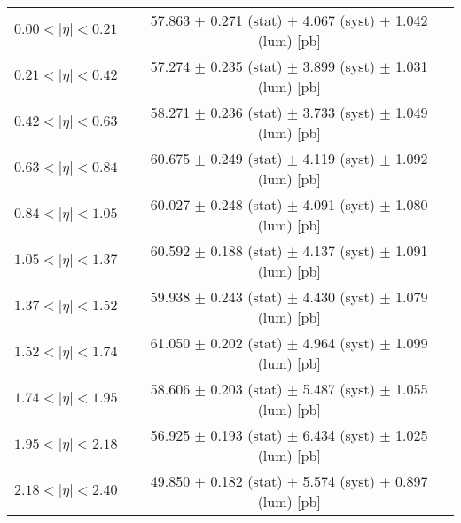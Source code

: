 \begin{tabular}{lc}
\hline
$0.00 < |\eta| <0.21$          & 57.863 $\pm$ 0.271 (stat) $\pm$ 4.067 (syst) $\pm$ 1.042 (lum) [pb]  \\
$0.21 < |\eta| <0.42$          & 57.274 $\pm$ 0.235 (stat) $\pm$ 3.899 (syst) $\pm$ 1.031 (lum) [pb]  \\
$0.42 < |\eta| <0.63$          & 58.271 $\pm$ 0.236 (stat) $\pm$ 3.733 (syst) $\pm$ 1.049 (lum) [pb]  \\
$0.63 < |\eta| <0.84$          & 60.675 $\pm$ 0.249 (stat) $\pm$ 4.119 (syst) $\pm$ 1.092 (lum) [pb]  \\
$0.84 < |\eta| <1.05$          & 60.027 $\pm$ 0.248 (stat) $\pm$ 4.091 (syst) $\pm$ 1.080 (lum) [pb]  \\
$1.05 < |\eta| <1.37$          & 60.592 $\pm$ 0.188 (stat) $\pm$ 4.137 (syst) $\pm$ 1.091 (lum) [pb]  \\
$1.37 < |\eta| <1.52$          & 59.938 $\pm$ 0.243 (stat) $\pm$ 4.430 (syst) $\pm$ 1.079 (lum) [pb]  \\
$1.52 < |\eta| <1.74$          & 61.050 $\pm$ 0.202 (stat) $\pm$ 4.964 (syst) $\pm$ 1.099 (lum) [pb]  \\
$1.74 < |\eta| <1.95$          & 58.606 $\pm$ 0.203 (stat) $\pm$ 5.487 (syst) $\pm$ 1.055 (lum) [pb]  \\
$1.95 < |\eta| <2.18$          & 56.925 $\pm$ 0.193 (stat) $\pm$ 6.434 (syst) $\pm$ 1.025 (lum) [pb]  \\
$2.18 < |\eta| <2.40$          & 49.850 $\pm$ 0.182 (stat) $\pm$ 5.574 (syst) $\pm$ 0.897 (lum) [pb]  \\
\hline
\end{tabular}
